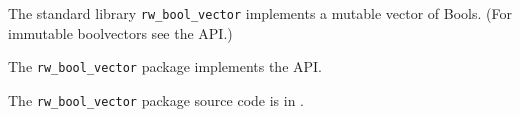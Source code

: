 
The standard library {\tt rw\_bool\_vector} implements a mutable vector of Bools. 
(For immutable boolvectors see the  API.)

The {\tt rw\_bool\_vector} package implements the  API.

The {\tt rw\_bool\_vector} package source code is in .



